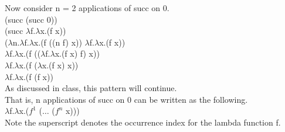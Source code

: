 \documentclass{jhwhw}
\begin{document}
	\bigbreak
	Now consider n = 2 applications of succ on 0. \\
	(succ (succ 0)) \\
	(succ $\lambda$f.$\lambda$x.(f x)) \\
	($\lambda$n.$\lambda$f.$\lambda$x.(f ((n f) x)) $\lambda$f.$\lambda$x.(f x)) \\
	$\lambda$f.$\lambda$x.(f (($\lambda$f.$\lambda$x.(f x) f) x)) \\
	$\lambda$f.$\lambda$x.(f ($\lambda$x.(f x) x)) \\
	$\lambda$f.$\lambda$x.(f (f x)) \\

	\bigbreak
	As discussed in class, this pattern will continue. \\
	That is, n applications of succ on 0 can be written as the following. \\
	$\lambda$f.$\lambda$x.($f^1$ ($\ldots$ ($f^n$ x))) \\
	Note the superscript denotes the occurrence index for the lambda function f. \\
\end{document}
